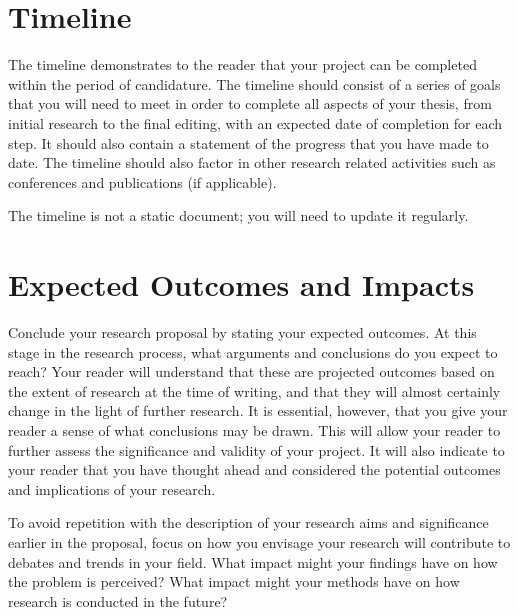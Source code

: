 \documentclass[12pt, a4paper]{article}
\begin{document}
\section{Timeline}
The timeline demonstrates to the reader that your project can be completed within the period of candidature. The timeline should consist of a series of goals that you will need to meet in order to complete all aspects of your thesis, from initial research to the final editing, with an expected date of completion for each step. It should also contain a statement of the progress that you have made to date. The timeline should also factor in other research related activities such as conferences and publications (if applicable).

The timeline is not a static document; you will need to update it regularly.


\section{Expected Outcomes and Impacts}
Conclude your research proposal by stating your expected outcomes. At this stage in the research process, what arguments and conclusions do you expect to reach? Your reader will understand that these are projected outcomes based on the extent of research at the time of writing, and that they will almost certainly change in the light of further research. It is essential, however, that you give your reader a sense of what conclusions may be drawn. This will allow your reader to further assess the significance and validity of your project. It will also indicate to your reader that you have thought ahead and considered the potential outcomes and implications of your research.

To avoid repetition with the description of your research aims and significance earlier in the proposal, focus on how you envisage your research will contribute to debates and trends in your field. What impact might your findings have on how the problem is perceived? What impact might your methods have on how research is conducted in the future?



\end{document}
